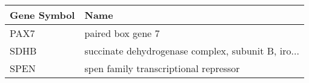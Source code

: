 \begin{tabular}{ll}
\toprule
Gene Symbol &                                               Name \\
\midrule
       PAX7 &                                  paired box gene 7 \\
       SDHB & succinate dehydrogenase complex, subunit B, iro... \\
       SPEN &              spen family transcriptional repressor \\
\bottomrule
\end{tabular}

